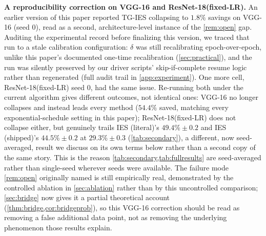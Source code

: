\documentclass{article}
\theoremstyle{plain}
\theoremstyle{definition}
\theoremstyle{remark}
\begin{document}
\textbf{A reproducibility correction on VGG-16 and ResNet-18(fixed-LR).} An earlier version of this paper reported TG-IES collapsing to $1.8\%$ savings on VGG-16 (seed 0), read as a second, architecture-level instance of the \cref{rem:open} gap. Auditing the experimental record before finalizing this version, we traced that run to a stale calibration configuration: $\delta$ was still recalibrating epoch-over-epoch, unlike this paper's documented one-time recalibration (\cref{sec:practical}), and the run was silently preserved by our driver scripts' skip-if-complete resume logic rather than regenerated (full audit trail in \cref{app:experiment}). One more cell, ResNet-18(fixed-LR) seed 0, had the same issue. Re-running both under the current algorithm gives different outcomes, not identical ones: VGG-16 no longer collapses and instead leads every method ($54.4\%$ saved, matching every exponential-schedule setting in this paper); ResNet-18(fixed-LR) does not collapse either, but genuinely trails IES (literal)'s $49.4\%\pm0.2$ and IES (shipped)'s $44.5\%\pm0.2$ at $29.3\%\pm0.3$ (\cref{tab:secondary}), a different, now seed-averaged, result we discuss on its own terms below rather than a second copy of the same story. This is the reason \cref{tab:secondary,tab:fullresults} are seed-averaged rather than single-seed wherever seeds were available. The failure mode \cref{rem:open} originally named is still empirically real, demonstrated by the controlled ablation in \cref{sec:ablation} rather than by this uncontrolled comparison; \cref{sec:bridge} now gives it a partial theoretical account (\cref{thm:bridge,cor:bridgeprob}), so this VGG-16 correction should be read as removing a false additional data point, not as removing the underlying phenomenon those results explain.
\end{document}
